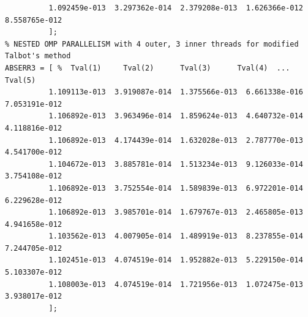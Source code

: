 \documentclass[a4paper,10pt]{report}%
\begin{document}
\begin{lstlisting}
          1.092459e-013  3.297362e-014  2.379208e-013  1.626366e-012  8.558765e-012
          ];
% NESTED OMP PARALLELISM with 4 outer, 3 inner threads for modified Talbot's method
ABSERR3 = [ %  Tval(1)     Tval(2)      Tval(3)      Tval(4)  ... Tval(5)
          1.109113e-013  3.919087e-014  1.375566e-013  6.661338e-016  7.053191e-012
          1.106892e-013  3.963496e-014  1.859624e-013  4.640732e-014  4.118816e-012
          1.106892e-013  4.174439e-014  1.632028e-013  2.787770e-013  4.541700e-012
          1.104672e-013  3.885781e-014  1.513234e-013  9.126033e-014  3.754108e-012
          1.106892e-013  3.752554e-014  1.589839e-013  6.972201e-014  6.229628e-012
          1.106892e-013  3.985701e-014  1.679767e-013  2.465805e-013  4.941658e-012
          1.103562e-013  4.007905e-014  1.489919e-013  8.237855e-014  7.244705e-012
          1.102451e-013  4.074519e-014  1.952882e-013  5.229150e-014  5.103307e-012
          1.108003e-013  4.074519e-014  1.721956e-013  1.072475e-013  3.938017e-012
          ];
\end{lstlisting}
\end{document}
